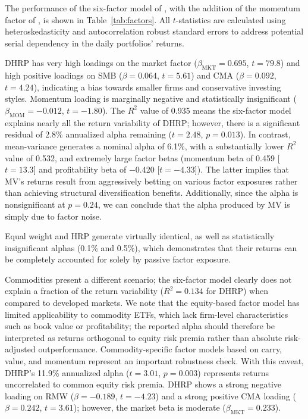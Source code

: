 \documentclass{article}
\begin{document}
The performance of the six-factor model of \citet{FamaFrench2015}, with the addition of the momentum factor of \citet{Carhart1997}, is shown in Table~\ref{tab:factors}. All $t$-statistics are calculated using \citet{NeweyWest1987} heteroskedasticity and autocorrelation robust standard errors to address potential serial dependency in the daily portfolios' returns.

DHRP has very high loadings on the market factor ($\beta_{\text{MKT}} = 0.695$, $t = 79.8$) and high positive loadings on SMB ($\beta = 0.064$, $t = 5.61$) and CMA ($\beta = 0.092$, $t = 4.24$), indicating a bias towards smaller firms and conservative investing styles. Momentum loading is marginally negative and statistically insignificant ($\beta_{\text{MOM}} = -0.012$, $t = -1.80$). The $R^2$ value of 0.935 means the six-factor model explains nearly all the return variability of DHRP; however, there is a significant residual of 2.8\% annualized alpha remaining ($t = 2.48$, $p = 0.013$). In contrast, mean-variance generates a nominal alpha of 6.1\%, with a substantially lower $R^2$ value of 0.532, and extremely large factor betas (momentum beta of 0.459 [$t = 13.3$] and profitability beta of $-$0.420 [$t = -4.33$]). The latter implies that MV's returns result from aggressively betting on various factor exposures rather than achieving structural diversification benefits. Additionally, since the alpha is nonsignificant at $p = 0.24$, we can conclude that the alpha produced by MV is simply due to factor noise.

Equal weight and HRP generate virtually identical, as well as statistically insignificant alphas (0.1\% and 0.5\%), which demonstrates that their returns can be completely accounted for solely by passive factor exposure.

Commodities present a different scenario; the six-factor model clearly does not explain a fraction of the return variability ($R^2 = 0.134$ for DHRP) when compared to developed markets. We note that the equity-based factor model has limited applicability to commodity ETFs, which lack firm-level characteristics such as book value or profitability; the reported alpha should therefore be interpreted as returns orthogonal to equity risk premia rather than absolute risk-adjusted outperformance. Commodity-specific factor models based on carry, value, and momentum \citep{AsnessMoskowitzPedersen2013} represent an important robustness check. With this caveat, DHRP's 11.9\% annualized alpha ($t = 3.01$, $p = 0.003$) represents returns uncorrelated to common equity risk premia. DHRP shows a strong negative loading on RMW ($\beta = -0.189$, $t = -4.23$) and a strong positive CMA loading ($\beta = 0.242$, $t = 3.61$); however, the market beta is moderate ($\beta_{\text{MKT}} = 0.233$).
\end{document}
